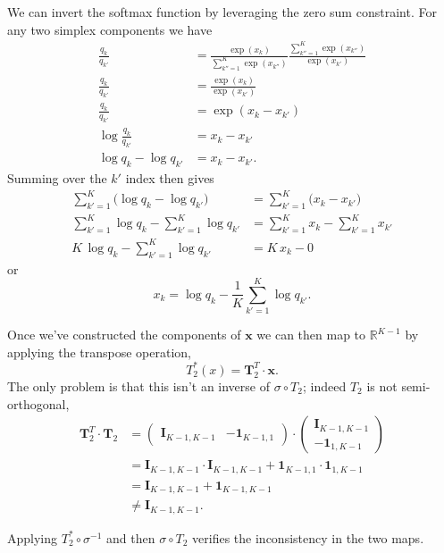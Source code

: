 \documentclass[
  letterpaper,
  DIV=11,
  numbers=noendperiod]{scrartcl}
\begin{document}
We can invert the softmax function by leveraging the zero sum
constraint. For any two simplex components we have \begin{align*}
\frac{ q_{k} }{ q_{k'} }
&=
\frac{ \exp( x_{k} ) }
{ \sum_{k'' = 1}^{K} \exp( x_{k''} ) }
\frac{ \sum_{k'' = 1}^{K} \exp( x_{k''} ) }
{ \exp( x_{k'} ) }
\\
\frac{ q_{k} }{ q_{k'} }
&=
\frac{ \exp( x_{k} ) }{ \exp( x_{k'} ) }
\\
\frac{ q_{k} }{ q_{k'} }
&=
\exp( x_{k} - x_{k'} )
\\
\log \frac{ q_{k} }{ q_{k'} }
&=
x_{k} - x_{k'}
\\
\log q_{k} - \log q_{k'}
&=
x_{k} - x_{k'}.
\end{align*} Summing over the \(k'\) index then gives \begin{align*}
\sum_{k' = 1}^{K} \big( \log q_{k} - \log q_{k'} \big)
&=
\sum_{k' = 1}^{K} \big( x_{k} - x_{k'} \big)
\\
\sum_{k' = 1}^{K} \log q_{k} - \sum_{k' = 1}^{K}  \log q_{k'}
&=
\sum_{k' = 1}^{K} x_{k} - \sum_{k' = 1}^{K} x_{k'}
\\
K \, \log q_{k} - \sum_{k' = 1}^{K}  \log q_{k'}
&=
K \, x_{k} - 0
\end{align*} or \[
x_{k} = \log q_{k} - \frac{1}{K} \sum_{k' = 1}^{K} \log q_{k'}.
\]

Once we've constructed the components of \(\mathbf{x}\) we can then map
to \(\mathbb{R}^{K - 1}\) by applying the transpose operation, \[
T^{*}_{2}(x)
=
\mathbf{T}_{2}^{T} \cdot \mathbf{x}.
\] The only problem is that this isn't an inverse of
\(\sigma \circ T_{2}\); indeed \(T_{2}\) is not semi-orthogonal,
\begin{align*}
\mathbf{T}_{2}^{T} \cdot \mathbf{T}_{2}
&=
\begin{pmatrix}
\mathbf{I}_{K - 1, K - 1} &
-\mathbf{1}_{K - 1, 1}
\end{pmatrix}
\cdot
\begin{pmatrix}
\mathbf{I}_{K - 1, K - 1} \\
-\mathbf{1}_{1, K - 1}
\end{pmatrix}
\\
&=
\mathbf{I}_{K - 1, K - 1} \cdot \mathbf{I}_{K - 1, K - 1}
+ \mathbf{1}_{K - 1, 1} \cdot \mathbf{1}_{1, K - 1}
\\
&=
\mathbf{I}_{K - 1, K - 1} + \mathbf{1}_{K - 1, K - 1}
\\
&\ne
\mathbf{I}_{K - 1, K - 1}.
\end{align*}

Applying \(T_{2}^{*} \circ \sigma^{-1}\) and then \(\sigma \circ T_{2}\)
verifies the inconsistency in the two maps.
\end{document}
